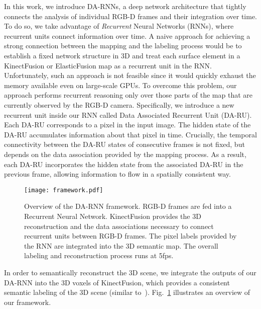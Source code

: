 \documentclass[conference]{IEEEtran}
\begin{document}
In this work, we introduce DA-RNNs, a deep network architecture that tightly connects the analysis of individual RGB-D frames and their integration over time.  To do so, we take advantage of \emph{Recurrent} Neural Networks (RNNs), where recurrent units connect information over time.  A naive approach for achieving a strong connection between the mapping and the labeling process would be to establish a fixed network structure in 3D and treat each surface element in a KinectFusion or ElasticFusion map as a recurrent unit in the RNN. Unfortunately, such an approach is not feasible since it would quickly exhaust the memory available even on large-scale GPUs. To overcome this problem, our approach performs recurrent reasoning only over those parts of the map that are currently observed by the RGB-D camera.  Specifically, we introduce a new recurrent unit inside our RNN called Data Associated Recurrent Unit (DA-RU). Each DA-RU corresponds to a pixel in the input image. The hidden state of the DA-RU accumulates information about that pixel in time.  Crucially, the temporal connectivity between the DA-RU states of consecutive frames is not fixed, but depends on the data association provided by the mapping process.  As a result, each DA-RU incorporates the hidden state from the associated DA-RU in the previous frame, allowing information to flow in a spatially consistent way.


\begin{figure}
	\centering
	\texttt{[image: framework.pdf]}
	\caption{Overview of the DA-RNN framework.  RGB-D frames are fed into a Recurrent Neural Network.  KinectFusion provides the 3D reconstruction and  the data associations necessary to connect recurrent units between RGB-D frames.  The pixel labels provided by the RNN are integrated into the 3D semantic map. The overall labeling and reconstruction process runs at 5fps.}
	\label{fig:framework}
	\vspace{-4mm}
\end{figure}

In order to semantically reconstruct the 3D scene, we integrate the outputs of our DA-RNN into the 3D voxels of KinectFusion, which provides a consistent semantic labeling of the 3D scene (similar to~\cite{lai2014unsupervised,mccormac2016semanticfusion}). Fig.~\ref{fig:framework} illustrates an overview of our framework.  
\end{document}
